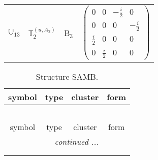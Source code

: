 \documentclass[fleqn,10pt,landscape]{article}
\begin{document}
\begin{itemize}
\begin{center}
\begin{longtable}{c|c|c|c}
$ \mathbb{U}_{13} $ & $\mathbb{T}_{2}^{(u,A_{2})}$ & B$_{3}$ & $\begin{pmatrix} 0 & 0 & - \frac{i}{2} & 0 \\ 0 & 0 & 0 & - \frac{i}{2} \\ \frac{i}{2} & 0 & 0 & 0 \\ 0 & \frac{i}{2} & 0 & 0 \end{pmatrix}$ \\
\end{longtable}
\end{center}
\begin{center}
\renewcommand{\arraystretch}{1.3}
\begin{longtable}{c|c|c|c}
\caption{Structure SAMB.}
 \\
 \hline \hline
symbol & type & cluster & form \\ \hline \endfirsthead

\multicolumn{3}{l}{\tablename\ \thetable{}} \\
 \hline \hline
symbol & type & cluster & form \\ \hline \endhead

 \hline \hline
\multicolumn{3}{r}{\footnotesize\it continued ...} \\ \endfoot

 \hline \hline
\multicolumn{3}{r}{} \\ \endlastfoot


\end{longtable}
\end{center}
\end{itemize}
\end{document}
